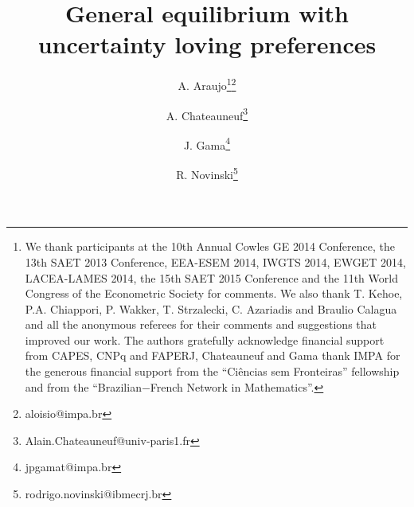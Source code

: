 \documentclass[pdftex]{article}
\numberwithin{equation}{section}
\theoremstyle{th}
\newtheorem{proof lemma}{{Proof Lemma}.}
\theoremstyle{definition}
\begin{document}
\title{General equilibrium with uncertainty loving preferences}
\author[1,2]{A. Araujo\thanks{We thank participants at the 10th Annual Cowles GE 2014 Conference, the 13th SAET 2013 Conference, EEA-ESEM 2014, IWGTS 2014, EWGET 2014, LACEA-LAMES 2014, the 15th SAET 2015 Conference and the 11th World Congress of the Econometric Society for comments. We also thank T. Kehoe, P.A. Chiappori, P. Wakker, T. Strzalecki, C. Azariadis and Braulio Calagua and all the anonymous referees for their comments and suggestions that improved our work. The authors gratefully acknowledge financial support from CAPES, CNPq and FAPERJ, Chateauneuf and Gama thank IMPA for the generous financial support from the ``Ci\^{e}ncias sem Fronteiras'' fellowship and from the ``Brazilian$-$French Network in Mathematics''.}\thanks{aloisio@impa.br}}
\author[3]{A. Chateauneuf\thanks{Alain.Chateauneuf@univ-paris1.fr}}
\author[1]{J. Gama\thanks{jpgamat@impa.br}}
\author[4]{R. Novinski\thanks{rodrigo.novinski@ibmecrj.br}}
\end{document}
